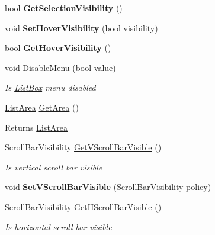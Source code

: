 \begin{DoxyCompactItemize}
bool {\bfseries Get\+Selection\+Visibility} ()
\item 
\mbox{\label{class_space_v_i_l_1_1_list_box_a446f0aeb6b309d517317ac95445f49a7}} 
void {\bfseries Set\+Hover\+Visibility} (bool visibility)
\item 
\mbox{\label{class_space_v_i_l_1_1_list_box_a17021d9e668e76fb722af658e1c3b42d}} 
bool {\bfseries Get\+Hover\+Visibility} ()
\item 
void \mbox{\hyperlink{class_space_v_i_l_1_1_list_box_a58e7bc1eb9a5846673a2d8b043dc66ed}{Disable\+Menu}} (bool value)
\begin{DoxyCompactList}\small\item\em Is \mbox{\hyperlink{class_space_v_i_l_1_1_list_box}{List\+Box}} menu disabled \end{DoxyCompactList}\item 
\mbox{\label{class_space_v_i_l_1_1_list_box_a518c69be16d0680f9e8e489ea2dec61f}} 
\mbox{\hyperlink{class_space_v_i_l_1_1_list_area}{List\+Area}} \mbox{\hyperlink{class_space_v_i_l_1_1_list_box_a518c69be16d0680f9e8e489ea2dec61f}{Get\+Area}} ()
\begin{DoxyCompactList}\small\item\em \begin{DoxyReturn}{Returns}
\mbox{\hyperlink{class_space_v_i_l_1_1_list_area}{List\+Area}} 
\end{DoxyReturn}
\end{DoxyCompactList}\item 
Scroll\+Bar\+Visibility \mbox{\hyperlink{class_space_v_i_l_1_1_list_box_a73be8ba2a9a2ec0556795defb6c5ae61}{Get\+V\+Scroll\+Bar\+Visible}} ()
\begin{DoxyCompactList}\small\item\em Is vertical scroll bar visible \end{DoxyCompactList}\item 
\mbox{\label{class_space_v_i_l_1_1_list_box_a9e7a7c07600950b84dfdd427f277a19e}} 
void {\bfseries Set\+V\+Scroll\+Bar\+Visible} (Scroll\+Bar\+Visibility policy)
\item 
Scroll\+Bar\+Visibility \mbox{\hyperlink{class_space_v_i_l_1_1_list_box_aa27ff72c81f6d24e1c5bcb325721f07d}{Get\+H\+Scroll\+Bar\+Visible}} ()
\begin{DoxyCompactList}\small\item\em Is horizontal scroll bar visible \end{DoxyCompactList}\item 

\end{DoxyCompactItemize}
